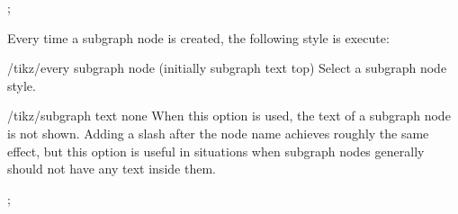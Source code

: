 \begin{codeexample}[] 
\tikz [subgraph text bottom=text centered,
       every subgraph node/.style={font=\itshape}]
  ;
\end{codeexample}  



Every time a subgraph node is created, the  following style is execute: 

\begin{key}{/tikz/every subgraph node (initially subgraph text top)}
  Select a subgraph node style.
\end{key}

\begin{key}{/tikz/subgraph text none}
  When this option is used, the text of a subgraph node is not
  shown. Adding a slash after the node name achieves roughly the same
  effect, but this option is useful in situations when subgraph nodes
  generally should not have any text inside them.
\begin{codeexample}[] 
  ;
\end{codeexample}  

\end{key}

